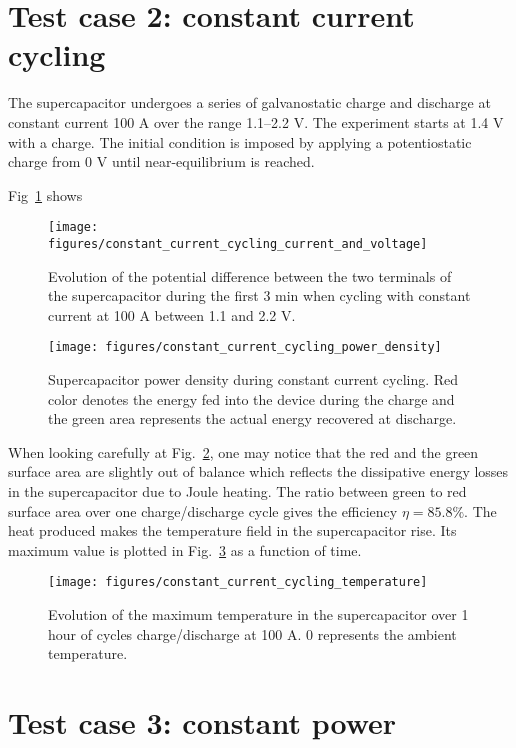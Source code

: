 \documentclass[10pt, oneside]{article}   	%
\begin{document}
\section{Test case 2: constant current cycling}
The supercapacitor undergoes a series of galvanostatic charge and discharge at
constant current 100 A over the range 1.1--2.2 V.
The experiment starts at 1.4 V with a charge.  The initial condition is
imposed by applying a potentiostatic charge from 0 V until near-equilibrium
is reached.

Fig~\ref{fig:constant_current_cycling_current_and_voltage} shows

\begin{figure}[h!]
    \centering
    \texttt{[image: figures/constant\_current\_cycling\_current\_and\_voltage]}
    \caption{Evolution of the potential difference between the two terminals
of the supercapacitor during the first 3 min when cycling with constant
current at 100 A between 1.1 and 2.2 V.
    }
    \label{fig:constant_current_cycling_current_and_voltage}
\end{figure}

\begin{figure}[h!]
    \centering
    \texttt{[image: figures/constant\_current\_cycling\_power\_density]}
    \caption{Supercapacitor power density during constant current cycling.
Red color denotes the energy fed into the device during the charge and the
green area represents the actual energy recovered at discharge.
    }
    \label{fig:constant_current_cycling_power_density}
\end{figure}
When looking carefully at
Fig.~\ref{fig:constant_current_cycling_power_density}, one may notice that
the red and the green surface area are slightly out of balance which reflects
the dissipative energy losses in the supercapacitor due to Joule heating.
The ratio between green to red surface area over one charge/discharge cycle
gives the efficiency $\eta = 85.8\%$.  The heat produced makes the temperature
field in the supercapacitor rise.  Its maximum value is plotted in
Fig.~\ref{fig:constant_current_cycling_temperature} as a function of time.


\begin{figure}[h!]
    \centering
    \texttt{[image: figures/constant\_current\_cycling\_temperature]}
    \caption{Evolution of the maximum temperature in the supercapacitor over
1 hour of cycles charge/discharge at 100 A.  0 represents the ambient
temperature.
    }
    \label{fig:constant_current_cycling_temperature}
\end{figure}

\section{Test case 3: constant power}







\end{document}
